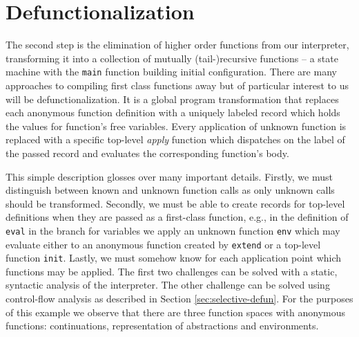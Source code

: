 \section{Defunctionalization}
The second step is the elimination of higher order functions from our interpreter, transforming it into a collection of mutually (tail-)recursive functions -- a state machine with the \lstinline{main} function building initial configuration.
There are many approaches to compiling first class functions away but of particular interest to us will be defunctionalization.
It is a global program transformation that replaces each anonymous function definition with a uniquely labeled record which holds the values for function's free variables.
Every application of unknown function is replaced with a specific top-level \textit{apply} function which dispatches on the label of the passed record and evaluates the corresponding function's body.

This simple description glosses over many important details.
Firstly, we must distinguish between known and unknown function calls as only unknown calls should be transformed.
Secondly, we must be able to create records for top-level definitions when they are passed as a first-class function, e.g., in the definition of \lstinline{eval} in the branch for variables we apply an unknown function \lstinline{env} which may evaluate either to an anonymous function created by \lstinline{extend} or a top-level function \lstinline{init}.
Lastly, we must somehow know for each application point which functions may be applied.
The first two challenges can be solved with a static, syntactic analysis of the interpreter.
The other challenge can be solved using control-flow analysis as described in Section \ref{sec:selective-defun}.
For the purposes of this example we observe that there are three function spaces with anonymous functions: continuations, representation of abstractions and environments.

